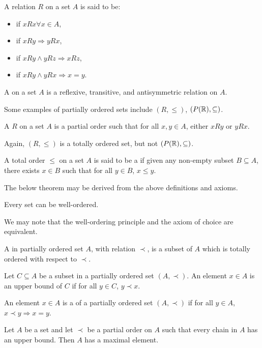 \begin{definition}
    A relation $R$ on a set $A$ is said to be:
    \begin{itemize}
        \item {} if $xRx \forall x \in A$,
        \item {} if $xRy \Rightarrow yRx$,
        \item {} if $xRy \wedge yRz \Rightarrow xRz$,
        \item {} if $xRy \wedge yRx \Rightarrow x = y$.
    \end{itemize}
\end{definition}

\begin{definition}
    A  on a set $A$ is a reflexive, transitive, and antisymmetric relation on $A$.
\end{definition}
Some examples of partially ordered sets include $(R, \leq)$, $(P(\mathbb{R}), \subseteq)$.

\begin{definition}
    A  $R$ on a set $A$ is a partial order such that for all $x,y \in A$, either $xRy$ or $yRx$.
\end{definition}
Again, $(R, \leq)$ is a totally ordered set, but not $(P(\mathbb{R}), \subseteq)$.
\begin{definition}
    A total order $\leq$ on a set $A$ is said to be a  if given any non-empty subset $B \subseteq A$, there exists $x \in B$ such that for all $y \in B$, $x \leq y$.
\end{definition}

The below theorem may be derived from the above definitions and axioms.

\begin{theorem}
    Every set can be well-ordered.
\end{theorem}
We may note that the well-ordering principle and the axiom of choice are equivalent.

\begin{definition}
    A  in partially ordered set $A$, with relation $\prec$, is a subset of $A$ which is totally ordered with respect to $\prec$.
\end{definition}
\begin{definition}
    Let $C \subseteq A$ be a subset in a partially ordered set $(A, \prec)$. An element $x \in A$ is an upper bound of $C$ if for all $y \in C$, $y \prec x$.
\end{definition}
\begin{definition}
    An element $x \in A$ is a  of a partially ordered set $(A, \prec)$ if for all $y \in A$, $x \prec y \Rightarrow x = y$.
\end{definition}
\begin{lemma}
    Let $A$ be a set and let $\prec$ be a partial order on $A$ such that every chain in $A$ has an upper bound. Then $A$ has a maximal element.
\end{lemma}


